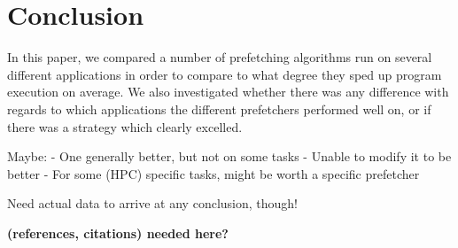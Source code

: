 
\section{Conclusion}
\label{sec:conclusion}

In this paper, we compared a number of prefetching algorithms run on
several different applications in order to compare to what degree they
sped up program execution on average. We also investigated whether
there was any difference with regards to which applications the
different prefetchers performed well on, or if there was a strategy
which clearly excelled. 

Maybe:
- One generally better, but not on some tasks
- Unable to modify it to be better
- For some (HPC) specific tasks, might be worth a specific prefetcher


Need actual data to arrive at any conclusion,
though!

{\bf (references, citations) needed here?}


